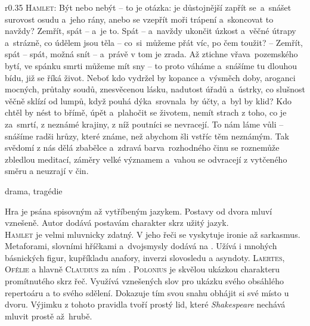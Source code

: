 \documentclass[../main.tex]{subfiles}
\begin{document}
\fontsize{10pt}{10pt}\selectfont\setlength\parindent{0em}

\noindent\begin{wrapfigure}{r}{0.35\textwidth}
\tiny{}\setlength{\parindent}{3pt}\noindent\textsc{Hamlet:} Být nebo nebýt -- to je otázka:
je důstojnější zapřít se~a~snášet surovost osudu a~jeho rány, anebo se vzepřít moři trápení a~skoncovat to navždy?
Zemřít, spát -- a~je to.
Spát -- a~navždy ukončit úzkost a~věčné útrapy a~strázně, co údělem jsou těla -- co~si~můžeme přát víc, po čem toužit?
-- Zemřít, spát -- spát, možná snít -- a~právě v tom je zrada.
Až ztichne vřava~pozemského bytí, ve spánku smrti můžeme mít sny -- to proto váháme a~snášíme tu dlouhou bídu, již se říká život.
Neboť kdo vydržel by kopance a~výsměch doby, aroganci mocných, průtahy soudů, znesvěcenou lásku, nadutost úřadů a~ústrky, co slušnost věčně sklízí od lumpů, když pouhá dýka~srovnala~by účty, a~byl by klid?
Kdo chtěl by nést to břímě, úpět a~plahočit se životem, nemít strach z toho, co je za~smrtí, z neznámé krajiny, z níž poutníci se nevracejí.
To nám láme vůli -- snášíme radši hrůzy, které známe, než abychom šli vstříc těm neznámým.
Tak svědomí z nás dělá zbabělce a~zdravá barva~rozhodného činu se roznemůže zbledlou meditací, záměry velké významem a~vahou se odvracejí z vytčeného směru a neuzrají v čin.
\end{wrapfigure}


\noindent drama, tragédie


\noindent Hra je psána spisovným až vytříbeným jazykem.
Postavy od dvora mluví vznešeně.
Autor dodává postavám charakter skrz užitý jazyk. \\
\textsc{Hamlet} je velmi mluvnicky zdatný.
V jeho řeči se vyskytuje ironie až sarkasmus.
Metaforami, slovními hříčkami a~dvojsmysly dodává na .
Užívá i mnohých básnických figur, kupříkladu anafory, inverzi slovosledu a asyndoty.
\textsc{Laertes}, \textsc{Ofélie} a hlavně \textsc{Claudius} za ním .
\textsc{Polonius} je skvělou ukázkou charakteru promítnutého skrz řeč.
Využívá  vznešených slov pro ukázku svého obsáhlého repertoáru a to  svého sdělení.
Dokazuje tím svou snahu obhájit si své místo u dvoru.
Výjimku z tohoto pravidla tvoří prostý lid, které \textit{Shakespeare} nechává mluvit prostě až~hrubě.  
\end{document}
